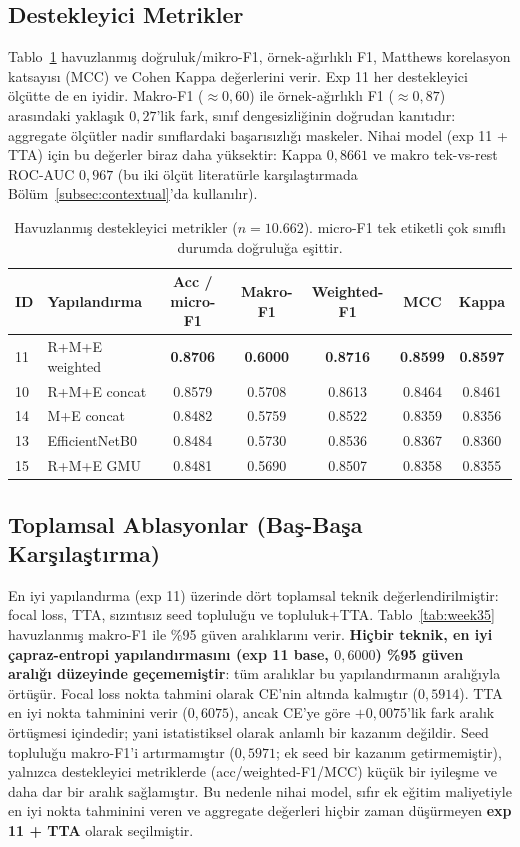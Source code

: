 \subsection{Destekleyici Metrikler}
\label{subsec:support-metrics}
Tablo~\ref{tab:extra} havuzlanmış doğruluk/mikro-F1, örnek-ağırlıklı F1, Matthews
korelasyon katsayısı (MCC) ve Cohen Kappa değerlerini verir. Exp 11 her
destekleyici ölçütte de en iyidir. Makro-F1 ($\approx 0{,}60$) ile örnek-ağırlıklı
F1 ($\approx 0{,}87$) arasındaki yaklaşık $0{,}27$'lik fark, sınıf dengesizliğinin
doğrudan kanıtıdır: aggregate ölçütler nadir sınıflardaki başarısızlığı maskeler.
Nihai model (exp 11 + TTA) için bu değerler biraz daha yüksektir: Kappa
$0{,}8661$ ve makro tek-vs-rest ROC-AUC $0{,}967$ (bu iki ölçüt literatürle
karşılaştırmada Bölüm~\ref{subsec:contextual}'da kullanılır).

\begin{table}[H]
\centering
\caption{Havuzlanmış destekleyici metrikler ($n=10{.}662$). micro-F1 tek etiketli
çok sınıflı durumda doğruluğa eşittir.}
\label{tab:extra}
\begin{tabular}{ll ccccc}
\toprule
ID & Yapılandırma & Acc / micro-F1 & Makro-F1 & Weighted-F1 & MCC & Kappa \\
\midrule
11 & R+M+E weighted & \textbf{0.8706} & \textbf{0.6000} & \textbf{0.8716} & \textbf{0.8599} & \textbf{0.8597} \\
10 & R+M+E concat   & 0.8579 & 0.5708 & 0.8613 & 0.8464 & 0.8461 \\
14 & M+E concat     & 0.8482 & 0.5759 & 0.8522 & 0.8359 & 0.8356 \\
13 & EfficientNetB0 & 0.8484 & 0.5730 & 0.8536 & 0.8367 & 0.8360 \\
15 & R+M+E GMU      & 0.8481 & 0.5690 & 0.8507 & 0.8358 & 0.8355 \\
\bottomrule
\end{tabular}
\end{table}

\subsection{Toplamsal Ablasyonlar (Baş-Başa Karşılaştırma)}
\label{subsec:week35}
En iyi yapılandırma (exp 11) üzerinde dört toplamsal teknik
değerlendirilmiştir: focal loss, TTA, sızıntısız seed topluluğu ve
topluluk+TTA. Tablo~\ref{tab:week35} havuzlanmış makro-F1 ile \%95 güven
aralıklarını verir. \textbf{Hiçbir teknik, en iyi çapraz-entropi yapılandırmasını
(exp 11 base, $0{,}6000$) \%95 güven aralığı düzeyinde geçememiştir}: tüm
aralıklar bu yapılandırmanın aralığıyla örtüşür. Focal loss nokta tahmini
olarak CE'nin altında kalmıştır ($0{,}5914$). TTA en iyi nokta tahminini verir
($0{,}6075$), ancak CE'ye göre $+0{,}0075$'lik fark aralık örtüşmesi içindedir;
yani istatistiksel olarak anlamlı bir kazanım değildir. Seed topluluğu makro-F1'i
artırmamıştır ($0{,}5971$; ek seed bir kazanım getirmemiştir), yalnızca
destekleyici metriklerde (acc/weighted-F1/MCC) küçük bir iyileşme ve daha dar bir
aralık sağlamıştır. Bu nedenle nihai model, sıfır ek
eğitim maliyetiyle en iyi nokta tahminini veren ve aggregate değerleri hiçbir
zaman düşürmeyen \textbf{exp 11 + TTA} olarak seçilmiştir.

